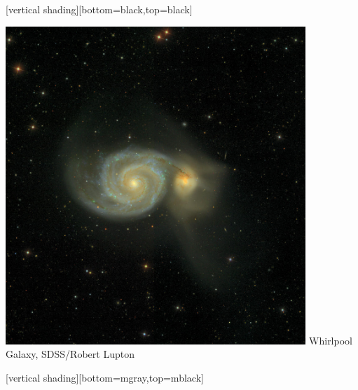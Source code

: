 \documentclass{beamer}
\begin{document}
{
    [vertical shading][bottom=black,top=black]

    \frame
    {	

        \begin{center}
            \includegraphics[trim=0 0 0 100,crop,width=0.85\textwidth]{M51-4x4.jpg}
            \newline
            \hfill {\tiny Whirlpool Galaxy, SDSS/Robert Lupton}
        \end{center}

    }
    [vertical shading][bottom=mgray,top=mblack]
}
\end{document}
